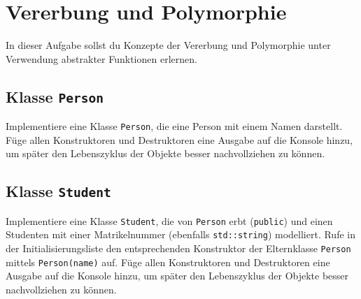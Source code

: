 \section{\ExercisePrefixObjectOrientation Vererbung und Polymorphie}\label{sec:inheritance}
In dieser Aufgabe sollst du Konzepte der Vererbung und Polymorphie unter Verwendung abstrakter Funktionen erlernen.

\subsection{Klasse \lstinline{Person}}
Implementiere eine Klasse \lstinline{Person}, die eine Person mit einem Namen darstellt.
Füge allen Konstruktoren und Destruktoren eine Ausgabe auf die Konsole hinzu, um später den Lebenszyklus der Objekte besser nachvollziehen zu können.



\subsection{Klasse \lstinline{Student}}
Implementiere eine Klasse \lstinline{Student}, die von \lstinline{Person} erbt (\lstinline{public}) und einen Studenten mit einer Matrikelnummer (ebenfalls \lstinline{std::string}) modelliert.
Rufe in der Initialisierungsliste den entsprechenden Konstruktor der Elternklasse \lstinline{Person} mittels \lstinline{Person(name)} auf.
Füge allen Konstruktoren und Destruktoren eine Ausgabe auf die Konsole hinzu, um später den Lebenszyklus der Objekte besser nachvollziehen zu können.

